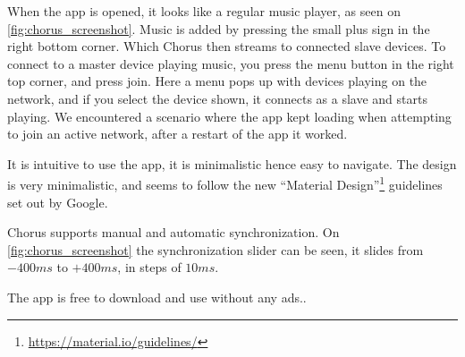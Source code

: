 When the app is opened, it looks like a regular music player, as seen on \cref{fig:chorus_screenshot}.
Music is added by pressing the small plus sign in the right bottom corner.
Which Chorus then streams to connected slave devices.
To connect to a master device playing music, you press the menu button in the right top corner, and press join.
Here a menu pops up with devices playing on the network, and if you select the device shown, it connects as a slave and starts playing.
We encountered a scenario where the app kept loading when attempting to join an active network, after a restart of the app it worked.

It is intuitive to use the app, it is minimalistic hence easy to navigate.
The design is very minimalistic, and seems to follow the new ``Material Design''\footnote{\url{https://material.io/guidelines/}} guidelines set out by Google.

Chorus supports manual and automatic synchronization.
On \cref{fig:chorus_screenshot} the synchronization slider can be seen,
it slides from $-400ms$ to $+400ms$, in steps of $10 ms$.

The app is free to download and use without any ads.\cite{chrous_play}.

